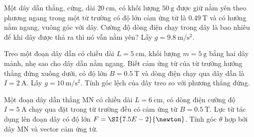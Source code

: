 \begin{ex}
Một dây dẫn thẳng, cứng, dài $\SI{20}{\centi\meter}$, có khối lượng $\SI{50}{\gram}$ được giữ nằm yên theo phương ngang trong một từ trường có độ lớn cảm ứng từ là $\SI{0.49}{\tesla}$ và có hướng nằm ngang, vuông góc với dây. Cường độ dòng điện chạy trong dây là bao nhiêu để khi dây được thả ra thì nó vẫn nằm yên? Lấy $g=\SI{9.8}{\meter/\second^2}$.
	
\end{ex}

\begin{ex}
Treo một đoạn dây dẫn có chiều dài $L=\SI{5}{\centi\meter}$, khối lượng $m=\SI{5}{\gram}$ bằng hai dây mảnh, nhẹ sao cho dây dẫn nằm ngang. Biết cảm ứng từ của từ trường hướng thẳng đứng xuống dưới, có độ lớn $B=\SI{0.5}{\tesla}$ và dòng điện chạy qua dây dẫn là $I=\SI{2}{\ampere}$. Lấy $g=\SI{10}{\meter/\second^2}$. Tính góc lệch của dây treo so với phương thẳng đứng.
\end{ex}
\begin{ex}
Một đoạn dây dẫn thẳng MN có chiều dài $L=\SI{6}{\centi\meter}$, có dòng điện cường độ $I=\SI{5}{\ampere}$ chạy qua đặt trong từ trường đều có cảm ứng từ $B=\SI{0.5}{\tesla}$. Lực từ tác dụng lên đoạn dây có độ lớn $F=\SI{7.5E-2}{\newton}$. Tính góc $\theta$ hợp bởi dây MN và vector cảm ứng từ.
\end{ex}

